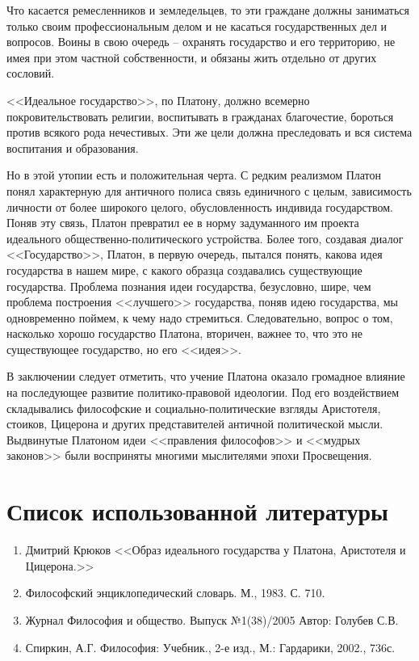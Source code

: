 	Что касается ремесленников и земледельцев, то эти граждане должны 
	заниматься только своим профессиональным делом и не касаться 
	государственных дел и вопросов. Воины в свою очередь – охранять государство 
	и его территорию, не имея при этом частной собственности, и обязаны жить 
	отдельно от других сословий. 

	<<Идеальное государство>>, по Платону, должно всемерно покровительствовать 
	религии, воспитывать в гражданах благочестие, бороться против всякого рода 
	нечестивых. Эти же цели должна преследовать и вся система воспитания и 
	образования.

	Но в этой утопии есть и положительная черта. С редким реализмом Платон 
	понял характерную для античного полиса связь единичного с целым, 
	зависимость личности от более широкого целого, обусловленность индивида 
	государством. Поняв эту связь, Платон превратил ее в норму задуманного 
	им проекта идеального общественно-политического устройства. Более того, 
	создавая диалог <<Государство>>, Платон, в первую очередь, пытался понять, 
	какова идея государства в нашем мире, с какого образца создавались 
	существующие государства. Проблема познания идеи государства, безусловно, 
	шире, чем проблема построения <<лучшего>> государства, поняв идею 
	государства, мы одновременно поймем, к чему надо стремиться. 
	Следовательно, вопрос о том, насколько хорошо государство Платона, 
	вторичен, важнее то, что это не существующее государство, но его <<идея>>.

	В заключении следует отметить, что учение Платона оказало громадное 
	влияние на последующее развитие политико-правовой идеологии. Под его 
	воздействием складывались философские и социально-политические взгляды 
	Аристотеля, стоиков, Цицерона и других представителей античной политической 
	мысли. Выдвинутые Платоном идеи <<правления философов>> и <<мудрых законов>> 
	были восприняты многими мыслителями эпохи Просвещения.

\pagebreak

\chapter{Список использованной литературы}
\begin{enumerate}
	\item Дмитрий Крюков <<Образ идеального государства у Платона, Аристотеля и Цицерона.>>
	\item Философский энциклопедический словарь. М., 1983. С. 710.
	\item Журнал Философия и общество. Выпуск №1(38)/2005 Автор: Голубев С.В.
	\item Спиркин, А.Г. Философия: Учебник., 2-е изд., М.: Гардарики, 2002., 736с.
\end{enumerate}
